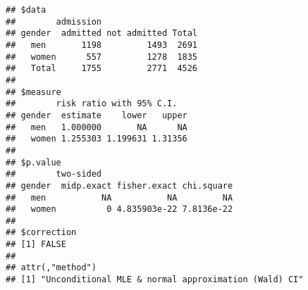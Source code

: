 \documentclass[
]{article}
\begin{document}
\begin{verbatim}
## $data
##        admission
## gender  admitted not admitted Total
##   men       1198         1493  2691
##   women      557         1278  1835
##   Total     1755         2771  4526
## 
## $measure
##        risk ratio with 95% C.I.
## gender  estimate    lower   upper
##   men   1.000000       NA      NA
##   women 1.255303 1.199631 1.31356
## 
## $p.value
##        two-sided
## gender  midp.exact fisher.exact chi.square
##   men           NA           NA         NA
##   women          0 4.835903e-22 7.8136e-22
## 
## $correction
## [1] FALSE
## 
## attr(,"method")
## [1] "Unconditional MLE & normal approximation (Wald) CI"
\end{verbatim}
\end{document}
